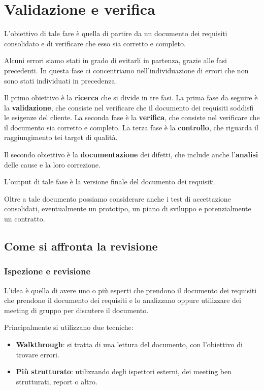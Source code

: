 \chapter{Validazione e verifica}
L'obiettivo di tale fare è quella di partire da un documento dei 
requisiti consolidato e di verificare che esso sia corretto e completo.

Alcuni errori siamo stati in grado di evitarli in partenza, grazie alle fasi 
precedenti. In questa fase ci concentriamo nell'individuazione di errori
che non sono stati individuati in precedenza. 

Il primo obiettivo è la \textbf{ricerca} che si divide in tre fasi.
La prima fase da seguire è la \textbf{validazione}, che consiste nel verificare 
che il documento dei requisiti soddisfi le esigenze del cliente.
La seconda fase è la \textbf{verifica}, che consiste nel verificare che il
documento sia corretto e completo.
La terza fase è la \textbf{controllo}, che riguarda il raggiungimento 
tei target di qualità.

Il secondo obiettivo è la \textbf{documentazione} dei difetti, che include 
anche l'\textbf{analisi} delle cause e la loro correzione.

\begin{tcolorbox}[colback=orange!5!white,colframe=orange!75!black,title=Output della fase]
    L'output di tale fase è la versione finale del documento dei requisiti.
    
    Oltre a tale documento possiamo considerare anche i test di accettazione consolidati, 
    eventualmente un prototipo, un piano di sviluppo e potenzialmente un contratto.
\end{tcolorbox}

\section{Come si affronta la revisione}
\subsection{Ispezione e revisione}
L'idea è quella di avere uno o più esperti che prendono il documento dei requisiti
che prendono il documento dei requisiti e lo analizzano oppure utilizzare dei meeting 
di gruppo per discutere il documento.

Principalmente si utilizzano due tecniche:
\begin{itemize}
    \item \textbf{Walkthrough}: si tratta di una lettura del documento,
    con l'obiettivo di trovare errori.
    \item \textbf{Più strutturato}: utilizzando degli ispettori esterni, dei 
    meeting ben strutturati, report o altro.
\end{itemize}

